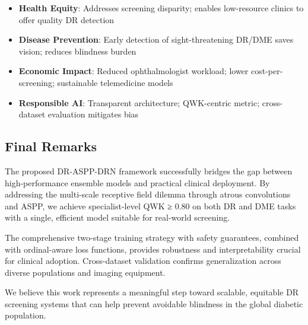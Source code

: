 \begin{itemize}
    \item \textbf{Health Equity}: Addresses screening disparity; enables low-resource clinics to offer quality DR detection
    
    \item \textbf{Disease Prevention}: Early detection of sight-threatening DR/DME saves vision; reduces blindness burden
    
    \item \textbf{Economic Impact}: Reduced ophthalmologist workload; lower cost-per-screening; sustainable telemedicine models
    
    \item \textbf{Responsible AI}: Transparent architecture; QWK-centric metric; cross-dataset evaluation mitigates bias
\end{itemize}

\subsection{Final Remarks}

The proposed DR-ASPP-DRN framework successfully bridges the gap between high-performance ensemble models and practical clinical deployment. By addressing the multi-scale receptive field dilemma through atrous convolutions and ASPP, we achieve specialist-level QWK ≥ 0.80 on both DR and DME tasks with a single, efficient model suitable for real-world screening.

The comprehensive two-stage training strategy with safety guarantees, combined with ordinal-aware loss functions, provides robustness and interpretability crucial for clinical adoption. Cross-dataset validation confirms generalization across diverse populations and imaging equipment.

We believe this work represents a meaningful step toward scalable, equitable DR screening systems that can help prevent avoidable blindness in the global diabetic population.

\newpage

